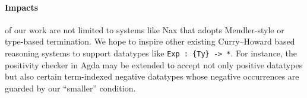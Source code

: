 \documentclass[a4paper]{easychair} %
\begin{document}
\paragraph{Impacts\!\!} of our work are not limited to
systems like Nax that adopts Mendler-style or type-based termination.
We hope to inspire other existing Curry--Howard based reasoning systems
to support datatypes like \texttt{Exp\,:\,\{Ty\}\,->\,*}.
For instance, the positivity checker in Agda may be extended to accept
not only positive datatypes but also certain term-indexed negative datatypes
whose negative occurrences are guarded by our ``smaller'' condition.

\end{document}
